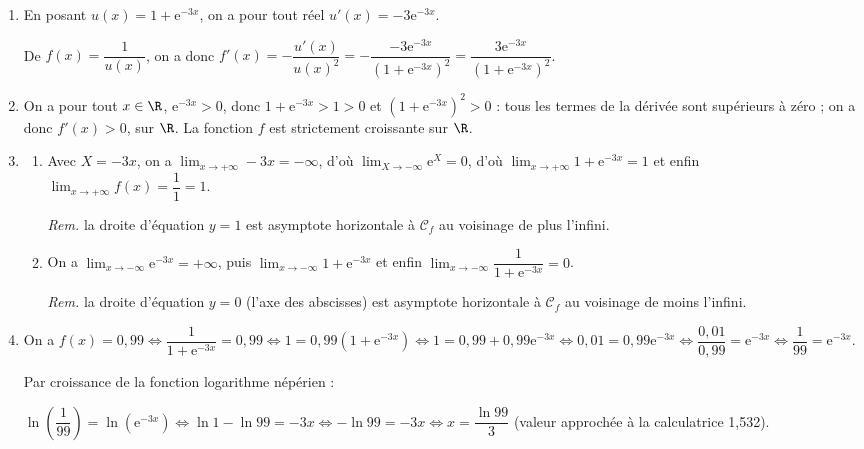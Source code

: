 \begin{enumerate}
\item %

En posant $u(x) = 1 + \text{e}^{- 3x}$, on a pour tout réel $u'(x) = -3\text{e}^{- 3x}$.

De $f(x) = \dfrac{1}{u(x)}$, on a donc $f'(x) = - \dfrac{u'(x)}{u(x)^2} = - \dfrac{-3\text{e}^{- 3x}}{\left(1 + \text{e}^{- 3x}\right)^2} = \dfrac{3\text{e}^{- 3x}}{\left(1 + \text{e}^{- 3x}\right)^2}$. 
\item %
On a pour tout $x \in \R$, \: $\text{e}^{- 3x} > 0$, donc $1 + \text{e}^{- 3x} > 1 > 0$ et $\left(1 + \text{e}^{- 3x}\right)^2 > 0$ : tous les termes de la dérivée sont supérieurs à zéro ; on a donc $f'(x) > 0$, sur $\R$. La fonction $f$ est strictement croissante sur $\R$.
\item
	\begin{enumerate}
		\item %
Avec $X = - 3x$, on a $\displaystyle\lim_{x \to + \infty} -3x = - \infty$, d'où $\displaystyle\lim_{X \to - \infty} \text{e}^{X} = 0$, d'où $\displaystyle\lim_{x \to + \infty}1 + \text{e}^{-3x} = 1$ et enfin $\displaystyle\lim_{x \to + \infty}f(x) = \dfrac11 = 1$.

\emph{Rem.} la droite d'équation $y = 1 $ est asymptote horizontale à $\mathcal{C}_f$ au voisinage de plus l'infini.
		\item %
On a $\displaystyle\lim_{x \to -\infty}\text{e}^{-3x} = + \infty$, puis $\displaystyle\lim_{x \to -\infty}1 + \text{e}^{-3x}$ et enfin $\displaystyle\lim_{x \to -\infty}\dfrac{1}{1 + \text{e}^{-3x}} = 0$.

\emph{Rem.} la droite d'équation $y = 0$ (l'axe des abscisses) est asymptote horizontale à $\mathcal{C}_f$ au voisinage de moins l'infini.
	\end{enumerate}
\item %
On a $f(x) = 0,99 \iff \dfrac{1}{1 + \text{e}^{- 3x}} = 0,99 \iff 1 = 0,99\left(1 + \text{e}^{- 3x}\right) \iff 1 = 0,99 + 0,99\text{e}^{- 3x} \iff 0,01 = 0,99\text{e}^{- 3x} \iff \dfrac{0,01}{0,99} = \text{e}^{- 3x}\iff \dfrac{1}{99} = \text{e}^{- 3x}$.

Par croissance de la fonction logarithme népérien :

$\ln\left(\dfrac{1}{99}\right) = \ln \left(\text{e}^{- 3x}\right)\iff \ln 1 - \ln 99 = - 3x \iff - \ln 99 = - 3x \iff x = \dfrac{\ln 99}{3}$ \quad (valeur approchée à la calculatrice 1,532).
\end{enumerate}

